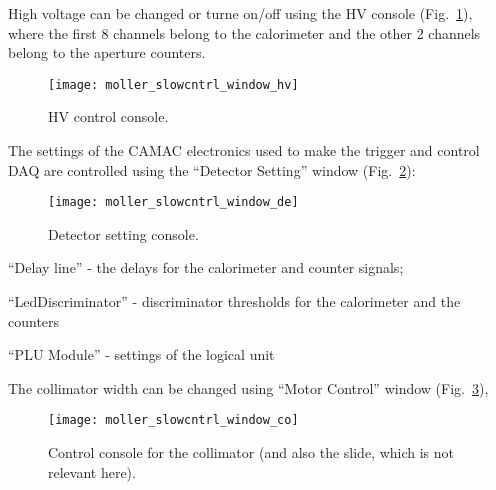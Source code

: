 {{  High voltage can be changed or turne on/off using the HV console (Fig.~\ref{fig:moller_slowc_hv}),
  where the first 8 channels belong to the calorimeter and the other 2 channels
  belong to the aperture counters.
   \begin{figure}[htb]
      \begin{center}
          \texttt{[image: moller\_slowcntrl\_window\_hv]}
      \end{center}
      \caption{HV control console.
            }
      \label{fig:moller_slowc_hv} 
   \end{figure}  
  The settings of the CAMAC electronics used to make the trigger
  and control DAQ are controlled using the ``Detector Setting'' window (Fig.~\ref{fig:moller_slowc_de}):
   \begin{figure}[htb]
      \begin{center}
          \texttt{[image: moller\_slowcntrl\_window\_de]}
      \end{center}
      \caption{Detector setting console.
            }
      \label{fig:moller_slowc_de} 
   \end{figure}  
   \begin{list}{--}{\setlength{\itemsep}{-0.15cm}}
     \item ``Delay line'' - the delays for the calorimeter and counter signals;
     \item ``LedDiscriminator'' - discriminator thresholds for the calorimeter and the counters
     \item ``PLU Module'' - settings of the logical unit
   \end{list}
  The collimator width can be changed using
  ``Motor Control'' window (Fig.~\ref{fig:moller_slowc_co}),
   \begin{figure}[htb]
      \begin{center}
          \texttt{[image: moller\_slowcntrl\_window\_co]}
      \end{center}
      \caption{Control console for the collimator (and also the slide, which is not relevant
               here).
            }
      \label{fig:moller_slowc_co} 
   \end{figure}  
}
}

